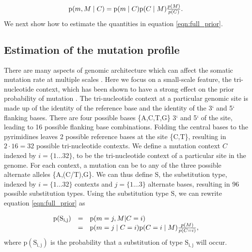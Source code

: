 \documentclass[a4,center,fleqn]{NAR}
\begin{document}
\begin{equation}
  \label{eqn:full_prior}
  $$
  \mathrm{p}(m,M \mid C) = \mathrm{p}(m \mid C) \mathrm{p}(C \mid M)\frac{p(M)}{p(C)}.
  $$
\end{equation}
We next show how to estimate the quantities in equation \ref{eqn:full_prior}.

\subsection{Estimation of the mutation profile}
There are many aspects of genomic architecture which can affect the somatic mutation rate at multiple scales \cite{Buisson2019}.
Here we focus on a small-scale feature, the tri-nucleotide context, which has been shown to have a strong effect on the prior probability of mutation \citep{Nik-Zainal2012a,Alexandrov2015,Lee-Six2018}.
The tri-nucleotide context at a particular genomic site is made up of the identity of the reference base and the identity of the 3` and 5` flanking bases.
There are four possible bases {\{A,C,T,G\}} 3` and 5` of the site, leading to 16 possible flanking base combinations.
Folding the central bases to the pyrimidines leaves 2 possible reference bases at the site {\{C,T\}}, resulting in $2 \cdot 16 = 32$ possible tri-nucleotide contexts.
We define a mutation context $C$ indexed by $i=\{1 \dots 32\}$, to be the tri-nucleotide context of a particular site in the genome. 
For each context, a mutation can be to any of the three possible alternate alleles {\{A,(C/T),G\}}. 
We can thus define $\mathrm{S}$, the substitution type, indexed by $i=\{1 \dots 32\}$ contexts and $j = \{1 \dots 3\}$ alternate bases, resulting in 96 possible substitution types.
Using the substitution type $\mathrm{S}$, we can rewrite equation \ref{eqn:full_prior} as 

\begin{equation}
  \label{eqn:detailed_prior}
  $$
  \begin{array}{rcl}
  \mathrm{p}(\mathrm{S_{i,j}}) &=&  \mathrm{p}(m =j, M | C = i) \\
                            &=& \mathrm{p}(m = j \mid C = i) \mathrm{p}(C = i \mid M)\frac{p(M)}{p(C = i)},
  \end{array}
  $$
\end{equation}
where $\mathrm{p}(\mathrm{S_{i,j}})$ is the probability that a substitution of type $\mathrm{S_{i,j}}$ will occur.
\end{document}
